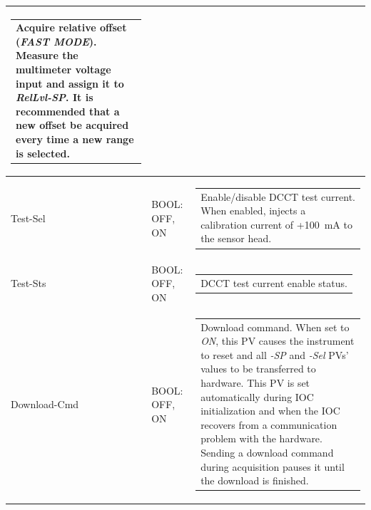 \documentclass[openany]{article}
\begin{document}
\begin{longtable}{| m{3.0cm} m{4.5cm} m{7.0cm} |}
\begin{tabular}{@{}m{6cm}@{}}
						Acquire relative offset (\emph{FAST MODE}). Measure the multimeter voltage input and assign it to \emph{RelLvl-SP}. It is recommended that a new offset be acquired every time a new range is selected.
						\end{tabular} \\ \hline
		Test-Sel & BOOL: OFF, ON & \begin{tabular}{@{}m{6cm}@{}}
	    					Enable/disable DCCT test current. When enabled, injects a calibration current of +\SI{100}{\milli\ampere} to the sensor head.
						\end{tabular} \\ \hline
		Test-Sts & BOOL: OFF, ON & \begin{tabular}{@{}m{6cm}@{}}
 						DCCT test current enable status.
						\end{tabular} \\ \hline
		Download-Cmd & BOOL: OFF, ON & \begin{tabular}{@{}m{6cm}@{}}
 						Download command. When set to \emph{ON}, this PV causes the instrument to reset and all \emph{-SP} and \emph{-Sel} PVs' values to be transferred to hardware. This PV is set automatically during IOC initialization and when the IOC recovers from a communication problem with the hardware. Sending a download command during acquisition pauses it until the download is finished.
						\end{tabular} \\ \hline
	\end{longtable}
\end{document}
